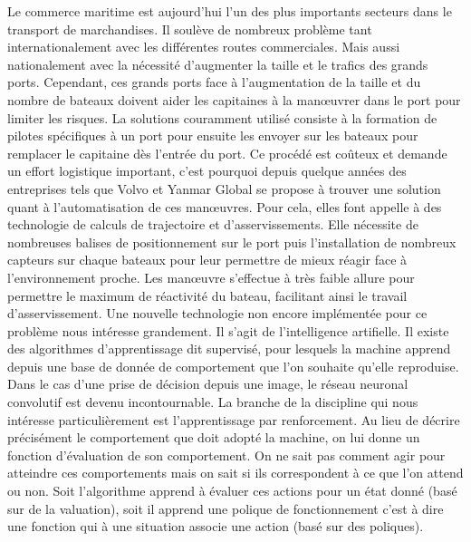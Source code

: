 \documentclass[12pt,a4paper]{extarticle}
\begin{document}
\indent Le commerce maritime est aujourd'hui l'un des plus importants secteurs dans le transport
de marchandises. Il soulève de nombreux problème tant internationalement avec les différentes 
routes commerciales. Mais aussi nationalement avec la nécessité d'augmenter la taille et le 
trafics des grands ports. Cependant, ces grands ports face à l'augmentation de la taille et du 
nombre de bateaux doivent aider les capitaines à la manœuvrer dans le port pour limiter les risques.
La solutions couramment utilisé consiste à la formation de pilotes spécifiques à un port pour 
ensuite les envoyer sur les bateaux pour remplacer le capitaine dès l'entrée du port. 
Ce procédé est coûteux et demande un effort logistique important, c'est pourquoi depuis quelque années des 
entreprises tels que Volvo et Yanmar Global se propose à trouver une solution quant à l'automatisation de 
ces manœuvres. Pour cela, elles font appelle à des technologie de calculs de trajectoire 
et d'asservissements. Elle nécessite de nombreuses balises de positionnement sur le port puis l'installation de nombreux capteurs sur chaque bateaux pour leur
permettre de mieux réagir face à l'environnement proche. Les manœuvre s'effectue à 
très faible allure pour permettre le maximum de réactivité du bateau, facilitant ainsi le 
travail d'asservissement.
\indent Une nouvelle technologie non encore implémentée pour ce problème nous intéresse grandement.
Il s'agit de l'intelligence artifielle. Il existe des algorithmes d'apprentissage dit
supervisé, pour lesquels la machine apprend depuis une base de donnée de comportement que
l'on souhaite qu'elle reproduise. Dans le cas d'une prise de décision depuis une image,
le réseau neuronal convolutif est devenu incontournable. La branche de la discipline qui
nous intéresse particulièrement est l'apprentissage par renforcement. Au lieu de décrire 
précisément le comportement que doit adopté la machine, on lui donne un fonction 
d'évaluation de son comportement. On ne sait pas comment agir pour atteindre ces comportements mais on sait si
ils correspondent à ce que l'on attend ou non. Soit l'algorithme apprend à évaluer ces
actions pour un état donné (basé sur de la valuation), soit il apprend une polique de
fonctionnement c'est à dire une fonction qui à une situation associe une action (basé sur
des poliques). 
 
\end{document}
